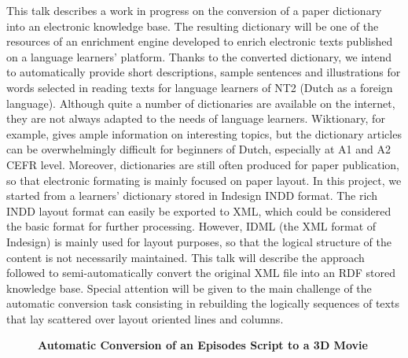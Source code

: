 \documentclass[10pt, a4paper, twopage, headinclude, footinclude, BCOR5mm]{scrartcl}
\begin{document}
{{\begin{table}[t!]
{\begin{tabular}{cc}
        
    \end{tabular} }
    \end{table}
        \begin{table}[t!]
    \end{table}

\noindent
This talk describes a work in progress on the conversion of a paper dictionary into an electronic knowledge base. The resulting dictionary will be one of the resources of an enrichment engine developed to enrich electronic texts published on a language learners' platform. Thanks to the converted dictionary, we intend to automatically provide short descriptions, sample sentences and illustrations for words selected in reading texts for language learners of NT2 (Dutch as a foreign language).  Although quite a number of dictionaries are available on the internet, they are not always adapted to the needs of language learners. Wiktionary, for example, gives ample information on interesting topics, but the dictionary articles can be overwhelmingly difficult for beginners of Dutch, especially at A1 and A2 CEFR level. Moreover, dictionaries are still often produced for paper publication, so that electronic formating is mainly focused on paper layout.  In this project, we started from a learners' dictionary stored in Indesign INDD format. The rich INDD layout format can easily be exported to XML, which could be considered the basic format for further processing. However, IDML (the XML format of Indesign) is mainly used for layout purposes, so that the logical structure of the content is not necessarily maintained.  This talk will describe the approach followed to semi-automatically convert the original XML file into an RDF stored knowledge base. Special attention will be given to the main challenge of the automatic conversion task consisting in rebuilding the logically sequences of texts that lay scattered over layout oriented lines and columns.


\newpage

\begin{figure}[t!]
\centering
\large\textbf{Automatic Conversion of an Episodes Script to a 3D Movie}
\vspace*{0.5cm}
\end{figure}


}}
\end{document}
